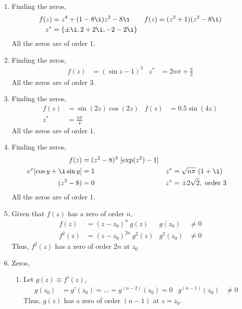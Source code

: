\begin{enumerate}
    \item Finding the zeros,
          \begin{align}
              f(z) & = z^4 + (1 - 8\i)z^2 - 8\i     &
              f(z) & = (z^2 + 1)(z^2 - 8\i)           \\
              z^*  & = \{\pm \i, 2 + 2\i, -2 -2\i\}
          \end{align}
          All the zeros are of order $ 1 $.

    \item Finding the zeros,
          \begin{align}
              f(z) & = (\sin z - 1)^3        &
              z^*  & = 2n\pi + \frac{\pi}{2}
          \end{align}
          All the zeros are of order $ 3 $.

    \item Finding the zeros,
          \begin{align}
              f(z) & = \sin(2z)\cos(2z) &
              f(z) & = 0.5\sin(4z)        \\
              z^*  & = \frac{n\pi}{4}
          \end{align}
          All the zeros are of order $ 1 $.

    \item Finding the zeros,
          \begin{align}
              f(z)                    & = (z^2 - 8)^3\ [\exp(z^2) - 1]     \\
              e^x[\cos y + \i \sin y] & = 1                              &
              z^*                     & = \sqrt{n\pi}\ (1 + \i)            \\
              (z^2 - 8)               & = 0                              &
              z^*                     & = \pm 2\sqrt{2},\ \text{order 3}
          \end{align}
          All the zeros are of order $ 1 $.

    \item Given that $ f(z) $ has a zero of order $ n $,
          \begin{align}
              f(z)     & = (z - z_0)^n\ g(z)      &
              g(z_0)   & \neq 0                     \\
              f^2(z)   & = (z - z_0)^{2n}\ g^2(z) &
              g^2(z_0) & \neq 0
          \end{align}
          Thus, $ f^2(z) $ has a zero of order $ 2n $ at $ z_0 $

    \item Zeros,
          \begin{enumerate}
              \item Let $ g(z) \equiv f'(z) $,
                    \begin{align}
                        g(z_0)         & = g'(z_0) = \dots = g^{(n-2)}(z_0) = 0 &
                        g^{(n-1)}(z_0) & \neq 0
                    \end{align}
                    Thus, $ g(z) $ has a zero of order $ (n-1) $ at $ z = z_0 $.


\end{enumerate}
\end{enumerate}

